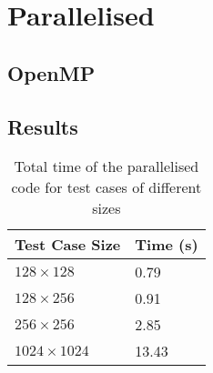 \documentclass[11pt, twocolumn, a4paper]{article}
\begin{document}
\section{Parallelised}

\subsection{OpenMP}

\subsection{Results}

\begin{table}[htbp]
    \begin{center}
    \caption{Total time of the parallelised code for test cases of different sizes}\label{tab:parallelised}
    \begin{tabular}{l | l} 
        \hline\hline
        Test Case Size&Time (s)\\
        \hline
        $128 \times 128$&0.79\\
        $128 \times 256$&0.91\\
        $256 \times 256$&2.85\\
        $1024 \times 1024$&13.43\\
        \hline
      \end{tabular}
    \end{center}
\end{table} 

\clearpage

\onecolumn{
  \printbibliography
}
\end{document}
